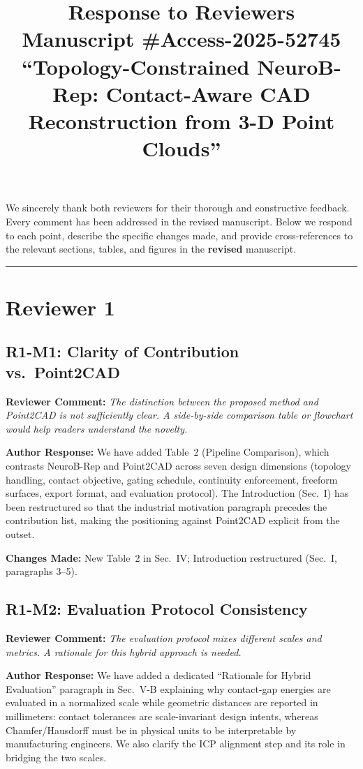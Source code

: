 \documentclass[11pt]{article}
\title{Response to Reviewers\\[4pt]
\large Manuscript \#Access-2025-52745\\
``Topology-Constrained NeuroB-Rep: Contact-Aware CAD\\
Reconstruction from 3-D Point Clouds''}
\author{}
\date{}
\newcommand{\RC}[1]{\noindent\textcolor{revcolor}{\textbf{Reviewer Comment:} \emph{#1}}\par\medskip}
\newcommand{\AR}[1]{\noindent\textcolor{respcolor}{\textbf{Author Response:} #1}\par\medskip}
\newcommand{\CH}[1]{\noindent\textbf{Changes Made:} #1\par\bigskip}
\begin{document}
\maketitle

We sincerely thank both reviewers for their thorough and constructive feedback.
Every comment has been addressed in the revised manuscript.
Below we respond to each point, describe the specific changes made, and
provide cross-references to the relevant sections, tables, and figures
in the \textbf{revised} manuscript.

\bigskip\hrule\bigskip

\section*{Reviewer 1}

\subsection*{R1-M1: Clarity of Contribution vs.\ Point2CAD}

\RC{The distinction between the proposed method and Point2CAD is not
sufficiently clear. A side-by-side comparison table or flowchart would
help readers understand the novelty.}

\AR{We have added Table~2 (Pipeline Comparison), which contrasts
NeuroB-Rep and Point2CAD across seven design dimensions (topology
handling, contact objective, gating schedule, continuity enforcement,
freeform surfaces, export format, and evaluation protocol).
The Introduction (Sec.~I) has been restructured so that the
industrial motivation paragraph precedes the contribution list,
making the positioning against Point2CAD explicit from the outset.}

\CH{New Table~2 in Sec.~IV; Introduction restructured (Sec.~I,
paragraphs 3--5).}

\subsection*{R1-M2: Evaluation Protocol Consistency}

\RC{The evaluation protocol mixes different scales and metrics.
A rationale for this hybrid approach is needed.}

\AR{We have added a dedicated ``Rationale for Hybrid Evaluation''
paragraph in Sec.~V-B explaining why contact-gap energies are
evaluated in a normalized scale while geometric distances are reported
in millimeters: contact tolerances are scale-invariant design intents,
whereas Chamfer/Hausdorff must be in physical units to be
interpretable by manufacturing engineers. We also clarify the
ICP alignment step and its role in bridging the two scales.}
\end{document}
